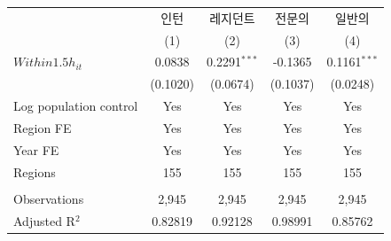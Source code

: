 \begingroup
\centering
\begin{tabular}{lcccc}
   \toprule
                          & 인턴     & 레지던트       & 전문의   & 일반의 \\   
                          & (1)      & (2)            & (3)      & (4)\\  
   \midrule 
   $Within1.5h_{it}$      & 0.0838   & 0.2291$^{***}$ & -0.1365  & 0.1161$^{***}$\\   
                          & (0.1020) & (0.0674)       & (0.1037) & (0.0248)\\   
   Log population control & Yes      & Yes            & Yes      & Yes\\  
   Region FE              & Yes      & Yes            & Yes      & Yes\\  
   Year FE                & Yes      & Yes            & Yes      & Yes\\  
   Regions                & 155      & 155            & 155      & 155\\  
    \\
   Observations           & 2,945    & 2,945          & 2,945    & 2,945\\  
   Adjusted R$^2$         & 0.82819  & 0.92128        & 0.98991  & 0.85762\\  
   \bottomrule
\end{tabular}
\par\endgroup
